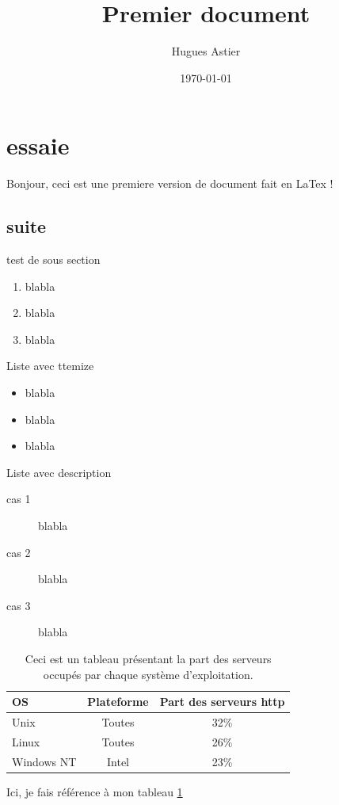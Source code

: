 \documentclass[12pt,a4paper,twoside]{article}
\begin{document}
\title{Premier document}
\author{Hugues Astier}
\date{\today}
\maketitle




\newpage
\section{essaie}
 \color{blue} Bonjour, ceci est une premiere version de document fait en LaTex ! \\
\subsection{suite}
\color{black}test de sous section

  
    


\begin{enumerate}
    \item blabla
    \item blabla
    \item blabla
\end{enumerate}
Liste avec ttemize
\begin{itemize}
    \item blabla
    \item blabla
    \item blabla
\end{itemize}
Liste avec description
\begin{description}
    \item[cas 1] blabla
    \item[cas 2] blabla
    \item[cas 3] blabla
\end{description}

\begin{table}
\begin{tabular}{|l|cc|}
OS & Plateforme & Part des serveurs http \\
\hline
Unix &Toutes & 32\% \\
Linux & Toutes & 26\% \\
Windows NT & Intel & 23\% \\
\end{tabular}
\caption{Ceci est un tableau présentant la part des serveurs
occupés par chaque système d’exploitation.}\label{tab_serveur}
\end{table}
Ici, je fais référence à mon tableau \ref{tab_serveur}
\end{document}
